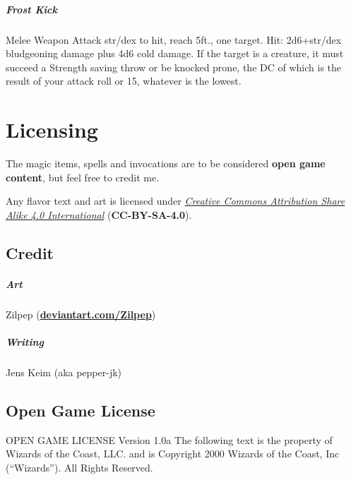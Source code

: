 \documentclass[letter,10pt,twocolumn,openany]{dndbook}
\begin{document}
\paragraph{Frost Kick} Melee Weapon Attack str/dex to hit, reach 5ft., one target. Hit: 2d6+str/dex bludgeoning damage plus 4d6 cold damage. If the target is a creature, it must succeed a Strength saving throw or be knocked prone, the DC of which is the result of your attack roll or 15, whatever is the lowest.

\backmatter

\chapter{Licensing}

The magic items, spells and invocations are to be considered \textbf{open game content}, but feel free to credit me.

Any flavor text and art is licensed under \href{https://creativecommons.org/licenses/by-sa/4.0/legalcode}{\textit{Creative Commons Attribution Share Alike 4.0 International}} (\textbf{CC-BY-SA-4.0}).

\section{Credit}

\paragraph{Art} Zilpep (\href{https://www.deviantart.com/zilpep}{\textbf{deviantart.com/Zilpep}})
\paragraph{Writing} Jens Keim (aka pepper-jk)

\section{Open Game License}

OPEN GAME LICENSE Version 1.0a The following text is the property of Wizards of the Coast, LLC. and is Copyright 2000 Wizards of the Coast, Inc (“Wizards”). All Rights Reserved.
\end{document}
